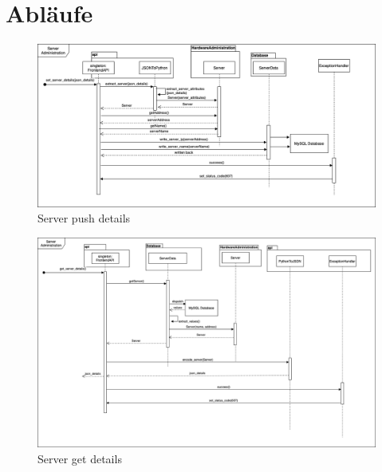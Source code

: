 \section{Abläufe}

\begin{figure}[H]
    \includegraphics[width=1\textwidth]{res/Server_Sequence.drawio.png} 
    \caption{Server push details}
\end{figure}
\begin{figure}[H]
    \includegraphics[width=1\textwidth]{res/server_get.png} 
    \caption{Server get details}
\end{figure}
\newpage

\newpage